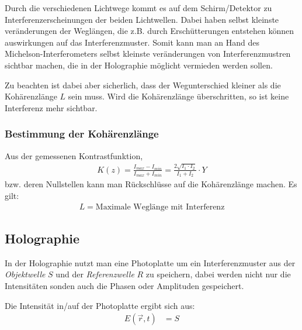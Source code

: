 
Durch die verschiedenen Lichtwege kommt es auf dem Schirm/Detektor zu Interferenzerscheinungen der beiden Lichtwellen. Dabei haben selbst kleinste veränderungen der Weglängen, die z.B. durch Erschütterungen entstehen können auswirkungen auf das Interferenzmuster. Somit kann man an Hand des Michelson-Interferometers selbst kleinste veränderungen von Interferenzmustren sichtbar machen, die in der Holographie möglicht vermieden werden sollen.

Zu beachten ist dabei aber sicherlich, dass der Wegunterschied kleiner als die Kohärenzlänge $L$ sein muss. Wird die Kohärenzlänge überschritten, so ist keine Interferenz mehr sichtbar.
\subsubsection{Bestimmung der Kohärenzlänge}
Aus der gemessenen Kontrastfunktion,
\begin{align}
K(z) = \frac{I_{max}-I_{min}}{I_{max}+I_{min}} = \frac{2\sqrt{I_1 \cdot I_2}}{I_1+I_2} \cdot Y
\end{align}
bzw. deren Nullstellen kann man Rückschlüsse auf die Kohärenzlänge machen. Es gilt:
\begin{align}
L = \text{Maximale Weglänge mit Interferenz}
\end{align}

\subsection{Holographie}
In der Holographie nutzt man eine Photoplatte um ein Interferenzmuster aus der \textit{Objektwelle} $S$ und der \textit{Referenzwelle} $R$ zu speichern, dabei werden nicht nur die Intensitäten sonden auch die Phasen oder Amplituden gespeichert.

Die Intensität in/auf der Photoplatte ergibt sich aus:
\begin{align}
E(\vec{r}, t) &= S 
\end{align}

\newpage
